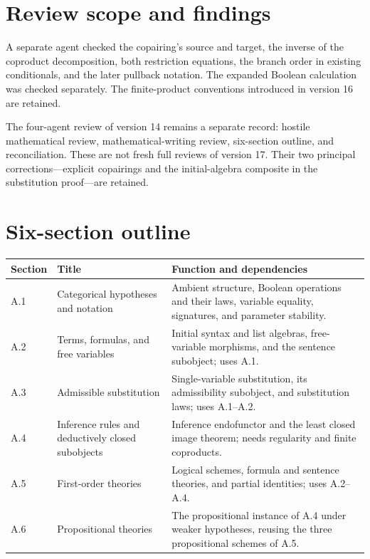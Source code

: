 \documentclass[10pt]{article}
\begin{document}
\section*{Review scope and findings}
A separate agent checked the copairing's source and target, the inverse
of the coproduct decomposition, both restriction equations, the branch order
in existing conditionals, and the later pullback notation. The expanded Boolean
calculation was checked separately. The finite-product conventions introduced
in version 16 are retained.

The four-agent review of version 14 remains a separate record: hostile
mathematical review, mathematical-writing review, six-section outline, and
reconciliation. These are not fresh full reviews of version 17. Their two
principal corrections---explicit copairings and the initial-algebra composite
in the substitution proof---are retained.

\newpage
\section*{Six-section outline}
\renewcommand{\arraystretch}{1.15}
\begin{tabularx}{\textwidth}{@{}p{}>{\raggedright\arraybackslash}p{}Y@{}}
\toprule
Section & Title & Function and dependencies\\\midrule
A.1 & Categorical hypotheses and notation & Ambient structure, Boolean
operations and their laws, variable equality, signatures, and parameter stability.\\
A.2 & Terms, formulas, and free variables & Initial syntax and list algebras,
free-variable morphisms, and the sentence subobject; uses A.1.\\
A.3 & Admissible substitution & Single-variable substitution, its admissibility
subobject, and substitution laws; uses A.1--A.2.\\
A.4 & Inference rules and deductively closed subobjects & Inference endofunctor
and the least closed image theorem; needs regularity and finite coproducts.\\
A.5 & First-order theories & Logical schemes, formula and sentence theories,
and partial identities; uses A.2--A.4.\\
A.6 & Propositional theories & The propositional instance of A.4 under weaker
hypotheses, reusing the three propositional schemes of A.5.\\\bottomrule
\end{tabularx}
\end{document}

